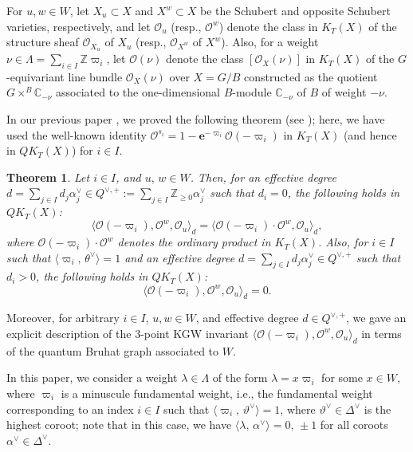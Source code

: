 \documentclass[11pt,a4paper,reqno,dvipdfmx]{amsart}
\numberwithin{equation}{section}
\newcommand{\BZ}{\mathbb{Z}}
\newcommand{\BC}{\mathbb{C}}
\newcommand{\CO}{\mathcal{O}}
\newcommand{\vpi}{\varpi}
\newcommand{\be}{\mathbf{e}}
\newcommand{\pair}[2]{\langle #1,\,#2 \rangle}
\theoremstyle{plain}
\newtheorem{ithm}{Theorem}
\theoremstyle{definition}
\theoremstyle{remark}
\begin{document}
For $u, w \in W$, let $X_{u} \subset X$ and $X^{w} \subset X$ be 
the Schubert and opposite Schubert varieties, respectively, 
and let $\CO_u$ (resp., $\CO^w$) denote the class in $K_{T}(X)$ 
of the structure sheaf $\CO_{X_{u}}$ of $X_u$ (resp., $\CO_{X^w}$ of $X^w$). 
Also, for a weight $\nu \in \Lambda = \sum_{i \in I} \BZ \varpi_i$, 
let $\CO(\nu)$ denote the class $[\CO_{X}(\nu)]$ in $K_{T}(X)$ of 
the $G$-equivariant line bundle $\CO_{X}(\nu)$ over $X = G/B$ constructed as the quotient 
$G \times^{B} \BC_{- \nu}$ associated to 
the one-dimensional $B$-module $\BC_{-\nu}$ of $B$ of weight $- \nu$. 

In our previous paper \cite{LNSX}, 
we proved the following theorem (see \cite[Theorems~3.1 and 3.2]{LNSX}); 
here, we have used the well-known identity $\CO^{s_i} = 1 - \be^{- \varpi_{i}} \CO(- \varpi_{i})$ in $K_{T}(X)$ (and hence in $QK_{T}(X)$) for $i \in I$. 
%
%
\begin{ithm}\label{ithm:divisor}
Let $i \in I$, and $u, \, w \in W$. 
Then, for an effective degree 
$d = \sum_{j \in I} d_j \alpha_j^{\vee} \in Q^{\vee,+} := 
\sum_{j \in I} \BZ_{\geq 0} \alpha_j^{\vee}$ such that $d_i=0$, 
the following holds in $QK_T(X)${\rm :} 
%
\begin{equation}\label{eq:part1}
\langle \CO(- \varpi_i), \CO^{w}, \CO_{u} \rangle_{d} =  
\langle \CO(- \varpi_i) \cdot \CO^{w}, \CO_{u} \rangle_{d},
%
\end{equation}
%
where $\CO(- \varpi_i) \cdot \CO^{w}$ denotes the ordinary product in $K_T(X)$. 
Also, for $i \in I$ such that $\pair{\vpi_i}{\theta^{\vee}} = 1$ and 
an effective degree 
$d = \sum_{j \in I} d_j \alpha_j^{\vee} \in Q^{\vee,+}$ such that $d_i > 0$, 
the following holds in $QK_T(X)${\rm :} 
%
\begin{equation} \label{eq:part2}
\langle \CO(- \varpi_i), \CO^w, \CO_u \rangle_{d} =  0. 
\end{equation}
%
\end{ithm}

Moreover, for arbitrary $i \in I$, $u, w \in W$, and 
effective degree $d \in Q^{\vee,+}$, we gave an explicit description of 
the 3-point KGW invariant $\langle \CO(- \varpi_i), \CO^{w}, \CO_{u} \rangle_{d}$ 
in terms of the quantum Bruhat graph associated to $W$. 

In this paper, we consider a weight $\lambda \in \Lambda$ of 
the form $\lambda = x \varpi_i$ for some $x \in W$, where $\varpi_i$ is a minuscule fundamental weight, 
i.e., the fundamental weight corresponding to an index $i \in I$ 
such that $\pair{\vpi_i}{\vartheta^{\vee}} = 1$, 
where $\vartheta^{\vee} \in \Delta^{\vee}$ is the highest coroot; 
note that in this case, we have $\pair{\lambda}{\alpha^{\vee}} = 0,\,\pm 1$ 
for all coroots $\alpha^{\vee} \in \Delta^{\vee}$. 
\end{document}
